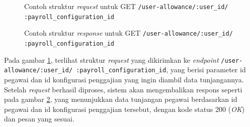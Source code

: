 \begin{figure}
    \centering
    \caption{Contoh struktur \textit{request} untuk GET \texttt{/user-allowance/{:user\_id}/ {:payroll\_configuration\_id}}}
    \label{fig:request_user_allowance_by_user_id_and_payroll_configuration_id_get}
\end{figure}
\begin{figure}
    \centering
    \caption{Contoh struktur \textit{response} untuk GET \texttt{/user-allowance/{:user\_id}/ {:payroll\_configuration\_id}}}
    \label{fig:response_user_allowance_by_user_id_and_payroll_configuration_id_get}
\end{figure}
Pada gambar \ref{fig:request_user_allowance_by_user_id_and_payroll_configuration_id_get}, terlihat struktur \textit{request} yang dikirimkan ke \textit{endpoint} \texttt{/user-allowance/{:user\_id}/ {:payroll\_configuration\_id}}, yang berisi parameter id pegawai dan id konfigurasi penggajian yang ingin diambil data tunjangannya. Setelah \textit{request} berhasil diproses, sistem akan mengembalikan respons seperti pada gambar \ref{fig:response_user_allowance_by_user_id_and_payroll_configuration_id_get}, yang menunjukkan data tunjangan pegawai berdasarkan id pegawai dan id konfigurasi penggajian tersebut, dengan kode status 200 (\textit{OK}) dan pesan yang sesuai.

